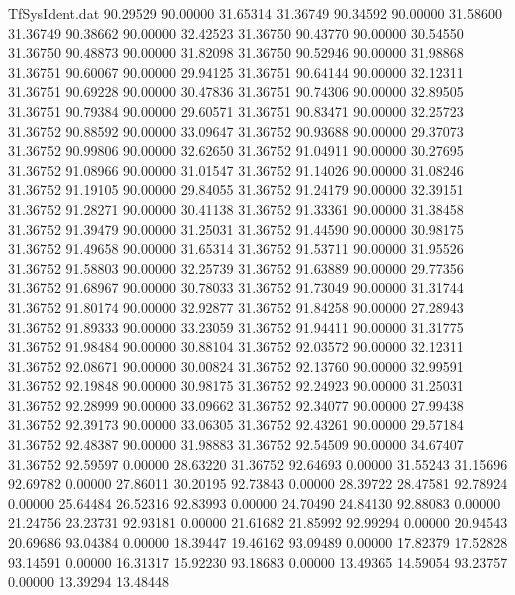 \begin{filecontents}{TfSysIdent.dat}
  90.29529   90.00000   31.65314   31.36749
  90.34592   90.00000   31.58600   31.36749
  90.38662   90.00000   32.42523   31.36750
  90.43770   90.00000   30.54550   31.36750
  90.48873   90.00000   31.82098   31.36750
  90.52946   90.00000   31.98868   31.36751
  90.60067   90.00000   29.94125   31.36751
  90.64144   90.00000   32.12311   31.36751
  90.69228   90.00000   30.47836   31.36751
  90.74306   90.00000   32.89505   31.36751
  90.79384   90.00000   29.60571   31.36751
  90.83471   90.00000   32.25723   31.36752
  90.88592   90.00000   33.09647   31.36752
  90.93688   90.00000   29.37073   31.36752
  90.99806   90.00000   32.62650   31.36752
  91.04911   90.00000   30.27695   31.36752
  91.08966   90.00000   31.01547   31.36752
  91.14026   90.00000   31.08246   31.36752
  91.19105   90.00000   29.84055   31.36752
  91.24179   90.00000   32.39151   31.36752
  91.28271   90.00000   30.41138   31.36752
  91.33361   90.00000   31.38458   31.36752
  91.39479   90.00000   31.25031   31.36752
  91.44590   90.00000   30.98175   31.36752
  91.49658   90.00000   31.65314   31.36752
  91.53711   90.00000   31.95526   31.36752
  91.58803   90.00000   32.25739   31.36752
  91.63889   90.00000   29.77356   31.36752
  91.68967   90.00000   30.78033   31.36752
  91.73049   90.00000   31.31744   31.36752
  91.80174   90.00000   32.92877   31.36752
  91.84258   90.00000   27.28943   31.36752
  91.89333   90.00000   33.23059   31.36752
  91.94411   90.00000   31.31775   31.36752
  91.98484   90.00000   30.88104   31.36752
  92.03572   90.00000   32.12311   31.36752
  92.08671   90.00000   30.00824   31.36752
  92.13760   90.00000   32.99591   31.36752
  92.19848   90.00000   30.98175   31.36752
  92.24923   90.00000   31.25031   31.36752
  92.28999   90.00000   33.09662   31.36752
  92.34077   90.00000   27.99438   31.36752
  92.39173   90.00000   33.06305   31.36752
  92.43261   90.00000   29.57184   31.36752
  92.48387   90.00000   31.98883   31.36752
  92.54509   90.00000   34.67407   31.36752
  92.59597    0.00000   28.63220   31.36752
  92.64693    0.00000   31.55243   31.15696
  92.69782    0.00000   27.86011   30.20195
  92.73843    0.00000   28.39722   28.47581
  92.78924    0.00000   25.64484   26.52316
  92.83993    0.00000   24.70490   24.84130
  92.88083    0.00000   21.24756   23.23731
  92.93181    0.00000   21.61682   21.85992
  92.99294    0.00000   20.94543   20.69686
  93.04384    0.00000   18.39447   19.46162
  93.09489    0.00000   17.82379   17.52828
  93.14591    0.00000   16.31317   15.92230
  93.18683    0.00000   13.49365   14.59054
  93.23757    0.00000   13.39294   13.48448

\end{filecontents}
